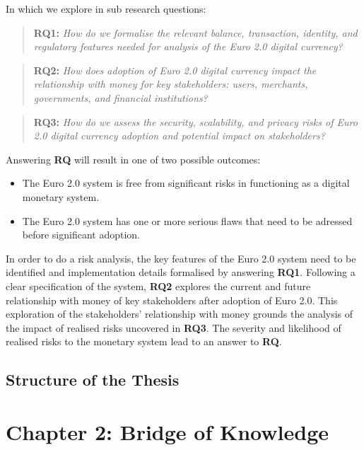 \documentclass[12pt]{article} %
\begin{document}
In which we explore in sub research questions:
\begin{quotation}
\textbf{RQ1: }\textit{How do we formalise the relevant balance, transaction, identity, and regulatory features needed for analysis of the Euro 2.0 digital currency?}
\end{quotation}
\begin{quotation}
\textbf{RQ2: }\textit{How does adoption of Euro 2.0 digital currency impact the relationship with money for key stakeholders: users, merchants, governments, and financial institutions?}
\end{quotation}
\begin{quotation}
\textbf{RQ3: }\textit{How do we assess the security, scalability, and privacy risks of Euro 2.0 digital currency adoption and potential impact on stakeholders?}
\end{quotation}

Answering \textbf{RQ} will result in one of two possible outcomes:
\begin{itemize}
	\item The Euro 2.0 system is free from significant risks in functioning as a digital monetary system.
	\item The Euro 2.0 system has one or more serious flaws that need to be adressed before significant adoption.
\end{itemize}
In order to do a risk analysis, the key features of the Euro 2.0 system need to be identified and implementation details formalised by answering \textbf{RQ1}. Following a clear specification of the system, \textbf{RQ2} explores the current and future relationship with money of key stakeholders after adoption of Euro 2.0. This exploration of the stakeholders' relationship with money grounds the analysis of the impact of realised risks uncovered in \textbf{RQ3}. The severity and likelihood of realised risks to the monetary system lead to an answer to \textbf{RQ}.

\subsection{Structure of the Thesis}


\pagebreak

\section{Chapter 2: Bridge of Knowledge}
\label{Bridge of Knowledge}
\end{document}
